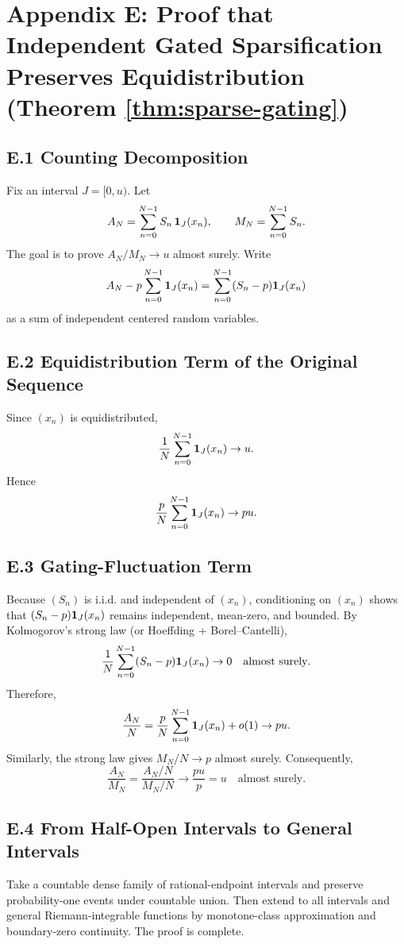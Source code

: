 ﻿\section{Appendix E: Proof that Independent Gated Sparsification Preserves Equidistribution (Theorem \ref{thm:sparse-gating})}
\label{app:sparse-gating}

\subsection{E.1 Counting Decomposition}

Fix an interval $J=[0,u)$. Let
\[
A_N=\sum_{n=0}^{N-1}S_n\,\mathbf{1}_J(x_n),\qquad M_N=\sum_{n=0}^{N-1}S_n.
\]
The goal is to prove $A_N/M_N\to u$ almost surely. Write
\[
A_N-p\sum_{n=0}^{N-1}\mathbf{1}_J(x_n)=\sum_{n=0}^{N-1}(S_n-p)\mathbf{1}_J(x_n)
\]
as a sum of independent centered random variables.

\subsection{E.2 Equidistribution Term of the Original Sequence}

Since $(x_n)$ is equidistributed,
\[
\frac{1}{N}\sum_{n=0}^{N-1}\mathbf{1}_J(x_n)\to u.
\]
Hence
\[
\frac{p}{N}\sum_{n=0}^{N-1}\mathbf{1}_J(x_n)\to pu.
\]

\subsection{E.3 Gating-Fluctuation Term}

Because $(S_n)$ is i.i.d. and independent of $(x_n)$, conditioning on $(x_n)$ shows that $(S_n-p)\mathbf{1}_J(x_n)$ remains independent, mean-zero, and bounded. By Kolmogorov's strong law (or Hoeffding + Borel--Cantelli),
\[
\frac{1}{N}\sum_{n=0}^{N-1}(S_n-p)\mathbf{1}_J(x_n)\to 0\quad\text{almost surely}.
\]
Therefore,
\[
\frac{A_N}{N}=\frac{p}{N}\sum_{n=0}^{N-1}\mathbf{1}_J(x_n)+o(1)\to pu.
\]
Similarly, the strong law gives $M_N/N\to p$ almost surely. Consequently,
\[
\frac{A_N}{M_N}=\frac{A_N/N}{M_N/N}\to \frac{pu}{p}=u\quad\text{almost surely}.
\]

\subsection{E.4 From Half-Open Intervals to General Intervals}

Take a countable dense family of rational-endpoint intervals and preserve probability-one events under countable union. Then extend to all intervals and general Riemann-integrable functions by monotone-class approximation and boundary-zero continuity. The proof is complete.

